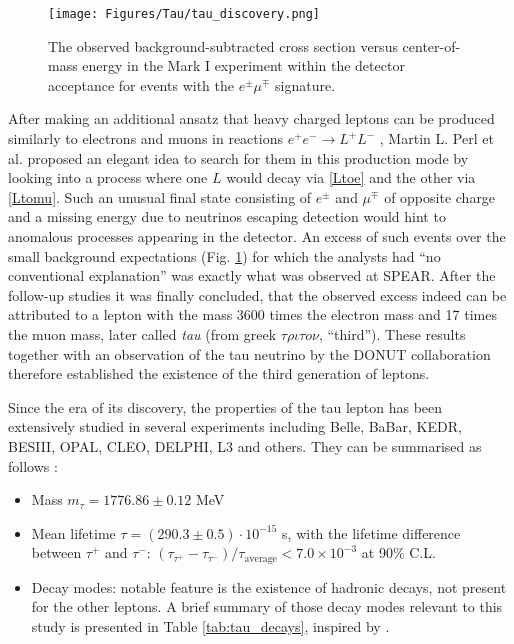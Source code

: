 \begin{figure}[ht!]
    \centering
    \texttt{[image: Figures/Tau/tau\_discovery.png]}
    \caption{The observed background-subtracted cross section versus center-of-mass energy in the Mark I experiment within the detector acceptance for events with the $e^\pm\mu^\mp$ signature. \cite{Perl:1975bf}}
    \label{fig:tau-discovery}
\end{figure}

After making an additional ansatz that heavy charged leptons can be produced similarly to electrons and muons in reactions $e^+e^- \to L^+L^-$ ,  Martin L. Perl et al. proposed an elegant idea to search for them in this production mode by looking into a process where one $L$ would decay via \ref{Ltoe} and the other via \ref{Ltomu}. Such an unusual final state consisting of $e^\pm$ and $\mu^\mp$ of opposite charge and a missing energy due to neutrinos escaping detection would hint to anomalous processes appearing in the detector. An excess of such events over the small background expectations (Fig. \ref{fig:tau-discovery}) for which the analysts had \enquote{no conventional explanation} was exactly what was observed at SPEAR. After the follow-up studies \cite{Feldman:1976fm, PLUTO:1977ctk, Barbaro-Galtieri:1977kfn, Bartel:1978ii, Bacino:1978gb, Bacino:1978wj} it was finally concluded, that the observed excess indeed can be attributed to a lepton with the mass 3600 times the electron mass and 17 times the muon mass, later called \textit{tau} (from greek $\tau\rho\iota\tau o\nu$, \enquote{third}). These results together with an observation of the tau neutrino by the DONUT collaboration \cite{DONUT:2000fbd} therefore established the existence of the third generation of leptons.

Since the era of its discovery, the properties of the tau lepton has been extensively studied in several experiments including Belle, BaBar, KEDR, BESIII, OPAL, CLEO, DELPHI, L3 and others. They can be summarised as follows \cite{ParticleDataGroup:2020ssz}:
\begin{itemize}
    \item Mass $m_\tau = 1776.86 \pm 0.12$ MeV
    \item Mean lifetime $\tau = (290.3 \pm 0.5) \cdot 10^{-15}$ s, with the lifetime difference between $\tau^+$ and $\tau^-$: $(\tau_{\tau^+} - \tau_{\tau^-})/\tau_\text{average} < 7.0 \times 10^{−3}$ at 90\% C.L.  
    \item Decay modes: notable feature is the existence of hadronic decays, not present for the other leptons. A brief summary of those decay modes relevant to this study is presented in Table \ref{tab:tau_decays}, inspired by \cite{CMS:2022prd}.
\end{itemize}

